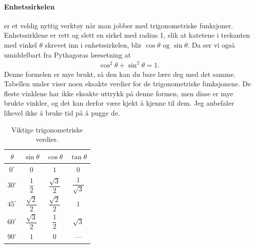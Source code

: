 \paragraph{Enhetssirkelen} er et veldig nyttig verktøy når man jobber med trigonometriske funksjoner. Enhetssirklene er rett og slett en sirkel med radius 1, slik at katetene i trekanten med vinkel $\theta$ skrevet inn i enhetssirkelen, blir $\cos\theta$ og $\sin\theta$. Da ser vi også umiddelbart fra Pythagoras læesetning at 
\begin{align*}
    \cos^2\theta + \sin^2\theta = 1.
\end{align*}
Denne formelen er mye brukt, så den kan du bare lære deg med det samme. Tabellen under viser noen eksakte verdier for de trigonometriske funksjonene. De fleste vinklene har ikke eksakte uttrykk på denne formen, men disse er mye brukte vinkler, og det kan derfor være kjekt å kjenne til dem. Jeg anbefaler likevel ikke å bruke tid på å pugge de.

\begin{table}[H]
\centering
\renewcommand{\arraystretch}{1.55}
\begin{tabular}{|c|c|c|c|}
\hline
\rowcolor{blue!20!black!10}
$\theta$ & $\sin\theta$ & $\cos\theta$ & $\tan\theta$ \\
\hline
$0^\circ$  & $0$ & $1$ & $0$ \\
\hline
$30^\circ$ & $\dfrac{1}{2}$ & $\dfrac{\sqrt{3}}{2}$ & $\dfrac{1}{\sqrt{3}}$ \\
\hline
$45^\circ$ & $\dfrac{\sqrt{2}}{2}$ & $\dfrac{\sqrt{2}}{2}$ & $1$ \\
\hline
$60^\circ$ & $\dfrac{\sqrt{3}}{2}$ & $\dfrac{1}{2}$ & $\sqrt{3}$ \\
\hline
$90^\circ$ & $1$ & $0$ & — \\
\hline
\end{tabular}
\caption{Viktige trigonometriske verdier.}
\label{tab:trig}
\end{table}


